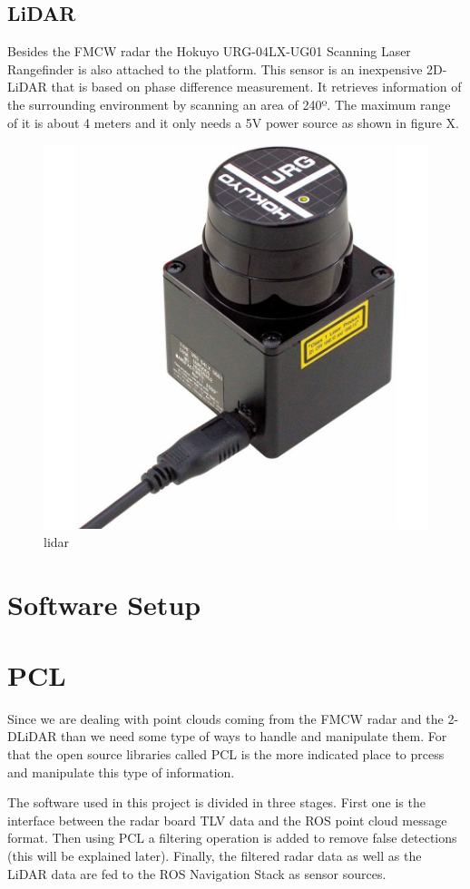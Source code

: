 \subsection{LiDAR}
Besides the \ac{FMCW} \ac{radar} the Hokuyo URG-04LX-UG01 Scanning Laser Rangefinder is also attached to the platform. This sensor is an inexpensive 2D-\ac{LiDAR} that is based on phase difference measurement. It retrieves information of the surrounding environment by scanning an area of 240º. The maximum range of it is about 4 meters and it only needs a 5V power source as shown in figure X.
\begin{figure}[h] 
\centerline{\includegraphics [width=0.5 \textwidth]{imgs/chapter4/lidar.jpg}}
\caption{lidar}
\label{fig:lidar}
\end{figure}

\section{Software Setup}
\section{PCL}
Since we are dealing with point clouds coming from the \ac{FMCW} \ac{radar} and the 2-D\ac{LiDAR} than we need some type of ways to handle and manipulate them. For that the open source libraries called \ac{PCL} is the more indicated place to prcess and manipulate this type of information.

The software used in this project is divided in three stages. First one is the interface between the radar board TLV data and the ROS point cloud message format. Then using \ac{PCL} a filtering operation is added to remove false detections (this will be explained later). Finally, the filtered radar data as well as the \ac{LiDAR} data are fed to the ROS Navigation Stack as sensor sources. 

